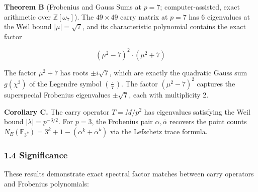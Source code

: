 \documentclass[
  11pt,
]{article}
\begin{document}
\textbf{Theorem B} (Frobenius and Gauss Sums at \(p = 7\); computer-assisted,
exact arithmetic over \(\mathbb{Z}[\omega_7]\)). The \(49 \times 49\) carry
matrix at \(p = 7\) has 6 eigenvalues at the Weil bound
\(\lvert\mu\rvert = \sqrt{7}\), and its characteristic polynomial contains the
exact factor

\[(\mu^2 - 7)^2 \cdot (\mu^2 + 7)\]

The factor \(\mu^2 + 7\) has roots \(\pm i\sqrt{7}\), which are exactly the
quadratic Gauss sum \(g(\chi^3)\) of the Legendre symbol
\(\left(\frac{\cdot}{7}\right)\). The factor \((\mu^2 - 7)^2\) captures the
superspecial Frobenius eigenvalues \(\pm\sqrt{7}\), each with multiplicity 2.

\textbf{Corollary C.} The carry operator \(T = M/p^2\) has eigenvalues
satisfying the Weil bound \(\lvert\lambda\rvert = p^{-3/2}\). For \(p = 3\), the
Frobenius pair \(\alpha, \bar{\alpha}\) recovers the point counts
\(N_E(\mathbb{F}_{3^k}) = 3^k + 1 - (\alpha^k + \bar{\alpha}^k)\) via the
Lefschetz trace formula.

\subsubsection{1.4 Significance}\label{significance}

These results demonstrate exact spectral factor matches between carry operators
and Frobenius polynomials:
\end{document}
